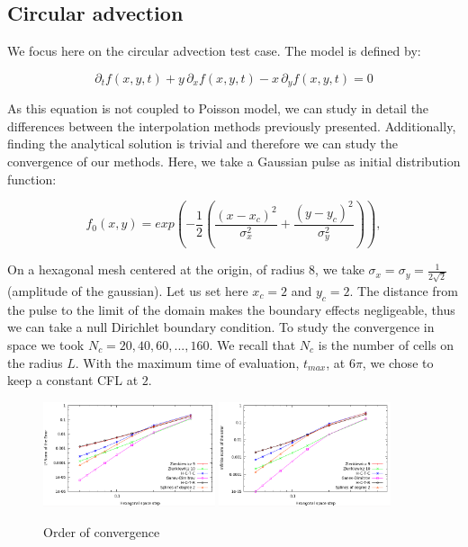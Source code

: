 \documentclass[proc]{edpsmath}
\begin{document}
\subsection{Circular advection}

We focus here on the circular advection test case. The model is defined by:

	\begin{equation}
		\partial_t f(x,y,t) + y\,\partial_x f(x,y,t) - x \,\partial_y f(x,y,t) = 0 
	\end{equation}

As this equation is not coupled to Poisson model, we can study in detail the differences between the interpolation methods previously presented.	Additionally, finding the analytical solution is trivial and therefore we can study the convergence of our methods. Here, we take a Gaussian pulse as initial distribution function:

	\begin{equation}
	 f_0(x,y) = exp  \left( -\dfrac{1}{2} \left( \dfrac{(x - x_c)^2}{\sigma_x^2} + \dfrac{(y - y_c)^2}{\sigma_y^2  } \right)   \right ), 
	\end{equation}

On a hexagonal mesh centered at the origin, of radius $8$,  we take  $\sigma_x = \sigma_y = \frac{1}{2\sqrt{2}}$ (amplitude of the gaussian). Let us set here $x_c = 2$ and $y_c = 2$. The distance from the pulse to the limit of the domain makes the boundary effects negligeable, thus we can take a null Dirichlet boundary condition.  To study the convergence in space we took $N_c = 20, 40, 60, ..., 160$. We recall that $N_c$ is the number of cells on the radius $L$. With the maximum time of evaluation, $t_{max}$, at $6 \pi$, we chose to keep a constant CFL at $2$.



\begin{figure}[h!]
	\includegraphics[width=0.45\textwidth]{figures/l2.png}
	\includegraphics[width=0.45\textwidth]{figures/inf_l.png}
	\caption{Order of convergence}
	\label{fig:circ_convergence}
\end{figure}
\end{document}
